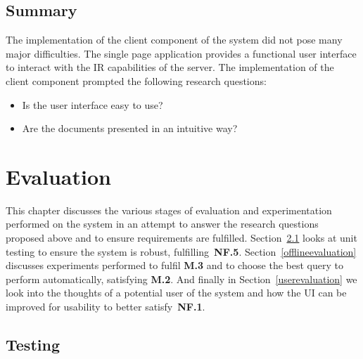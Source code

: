 \documentclass{l4proj}
\begin{document}
\section{Summary} \label{clientsummary}
The implementation of the client component of the system did not pose many major difficulties. The single page application provides a functional user interface to interact with the IR capabilities of the server.
The implementation of the client component prompted the following research questions:
\begin{itemize}
\item Is the user interface easy to use?
\item Are the documents presented in an intuitive way?
\end{itemize}

\chapter{Evaluation} \label{evaluation}
This chapter discusses the various stages of evaluation and experimentation performed on the system in an attempt to answer the research questions proposed above and to ensure requirements are fulfilled.
Section~\ref{testing} looks at unit testing to ensure the system is robust, fulfilling~\textbf{NF.5}.
Section~\ref{offlineevaluation} discusses experiments performed to fulfil \textbf{M.3} and to choose the best query to perform automatically, satisfying \textbf{M.2}.
And finally in Section~\ref{userevaluation} we look into the thoughts of a potential user of the system and how the UI can be improved for usability to better satisfy~\textbf{NF.1}.
\section{Testing} \label{testing}
\end{document}
